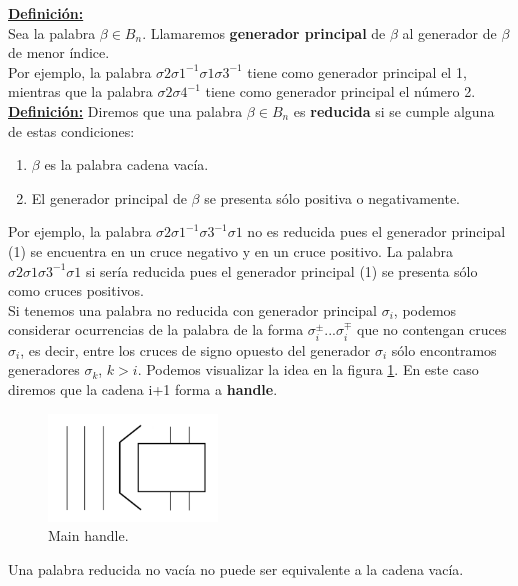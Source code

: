 \underline{\textbf{Definición:}}\\
Sea la palabra $\beta \in B_{n}$. Llamaremos \textbf{generador principal} de $\beta$ al generador de $\beta$ de menor índice.\\

Por ejemplo, la palabra $\sigma2\sigma1^{-1}\sigma1\sigma3^{-1}$ tiene como generador principal el 1, mientras que la palabra $\sigma2\sigma4^{-1}$ tiene como generador principal el número 2. \\

\textbf{\underline{Definición:}}
Diremos que una palabra $\beta \in B_{n}$ es \textbf{reducida} si se cumple alguna de estas condiciones:
\begin{enumerate}

	\item $\beta$ es la palabra cadena vacía.
	\item El generador principal de $\beta$ se presenta sólo positiva o negativamente. 
\end{enumerate}
 
Por ejemplo, la palabra $\sigma2\sigma1^{-1}\sigma3^{-1}\sigma1$ no es reducida pues el generador principal (1) se encuentra en un cruce negativo y en un cruce positivo. La palabra $\sigma2\sigma1\sigma3^{-1}\sigma1$ si sería reducida pues el generador principal (1) se presenta sólo como cruces positivos.\\

Si tenemos una palabra no reducida con generador principal $ \sigma_{i} $, podemos considerar ocurrencias de la palabra de la forma $ \sigma_{i}^{\pm} ... \sigma_{i}^{\mp} $ que no contengan cruces $ \sigma_{i} $, es decir, entre los cruces de signo opuesto del generador $ \sigma_{i} $ sólo encontramos generadores $ \sigma_{k} $, $ k>i $. Podemos visualizar la idea en la figura \ref{h1}. En este caso diremos que la cadena i+1 forma a\textbf{ handle}.\\
\begin{figure}[h!]
	\centering
	\includegraphics[width=4.5cm]{itrenzas/h11.png}
	\caption{Main handle.}
	\label{h1} 
\end{figure}

\begin{pro}
	Una palabra reducida no vacía no puede ser equivalente a la cadena vacía.
\end{pro}

